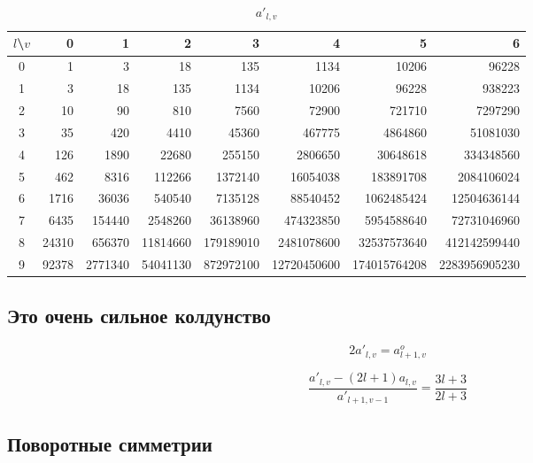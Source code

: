 \documentclass[12pt]{article}
\begin{document}
\begin{table}[H!]
	\center
	\caption{$a'_{l,v}$}
	\begin{tabular}{|c||r|r|r|r|r|r|r|}
	\hline
	$l$\textbackslash $v$
	  &     0 &       1 &        2 &         3 &           4 &            5 &             6 \\
	\hline\hline
	0 &     1 &       3 &       18 &       135 &        1134 &        10206 &         96228 \\
	1 &     3 &      18 &      135 &      1134 &       10206 &        96228 &        938223 \\
	2 &    10 &      90 &      810 &      7560 &       72900 &       721710 &       7297290 \\
	3 &    35 &     420 &     4410 &     45360 &      467775 &      4864860 &      51081030 \\
	4 &   126 &    1890 &    22680 &    255150 &     2806650 &     30648618 &     334348560 \\
	5 &   462 &    8316 &   112266 &   1372140 &    16054038 &    183891708 &    2084106024 \\
	6 &  1716 &   36036 &   540540 &   7135128 &    88540452 &   1062485424 &   12504636144 \\
	7 &  6435 &  154440 &  2548260 &  36138960 &   474323850 &   5954588640 &   72731046960 \\
	8 & 24310 &  656370 & 11814660 & 179189010 &  2481078600 &  32537573640 &  412142599440 \\
	9 & 92378 & 2771340 & 54041130 & 872972100 & 12720450600 & 174015764208 & 2283956905230 \\
	\hline
	\end{tabular}
\end{table}

\subsection{Это очень сильное колдунство}
\begin{equation}
2 a'_{l,v} = a^o_{l + 1,v}
\end{equation}

\begin{equation}
\frac{a'_{l,v} - (2 l + 1) a_{l,v}}{a'_{l + 1, v - 1}} = \frac{3 l + 3}{2 l + 3}
\end{equation}

\subsection{Поворотные симметрии}
\end{document}
